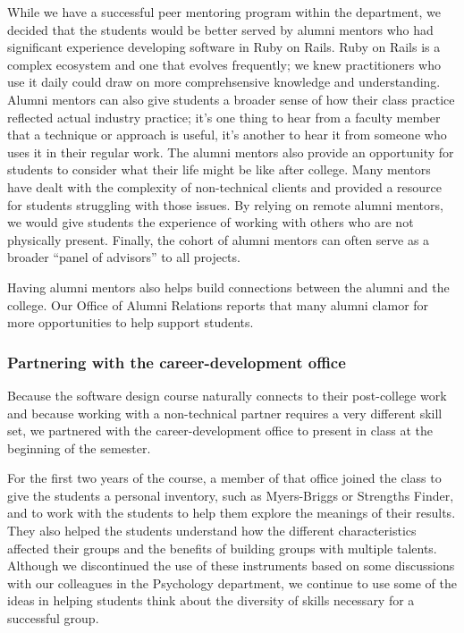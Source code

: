 While we have a successful peer mentoring program within the department,
we decided that the students would be better served by alumni mentors
who had significant experience developing software in Ruby on Rails.
Ruby on Rails is a complex ecosystem and one that evolves
frequently; we knew practitioners who use it daily could draw on
more comprehsensive knowledge and understanding.  Alumni mentors
can also give students a broader sense of how their class practice
reflected actual industry practice; it's one thing to hear from a
faculty member that a technique or approach is useful, it's another
to hear it from someone who uses it in their regular work.  The
alumni mentors also provide an opportunity for students to consider
what their life might be like after college.  Many mentors have
dealt with the complexity of non-technical clients and provided a
resource for students struggling with those issues.  By relying on
remote alumni mentors, we would give students the experience of
working with others who are not physically present.  Finally, the
cohort of alumni mentors can often serve as a broader ``panel of
advisors'' to all projects.

Having alumni mentors also helps build connections between
the alumni and the college.  Our Office of Alumni Relations reports
that many alumni clamor for more opportunities to help support
students.

\subsubsection{Partnering with the career-development office}

Because the software design course naturally connects to their
post-college work and because working with a non-technical partner
requires a very different skill set, we partnered with the
career-development office to present in class at the beginning of
the semester.

For the first two years of the course, a member of that office
joined the class to give the students a personal 
inventory, such as Myers-Briggs or Strengths Finder, and to work
with the students to help them explore the meanings of their results.
They also helped the students understand how the different
characteristics affected their groups and the benefits of building
groups with multiple talents.  Although we discontinued the use of
these instruments based on some discussions with our colleagues in
the Psychology department, we continue to use some of the ideas in
helping students think about the diversity of skills necessary for
a successful group.

